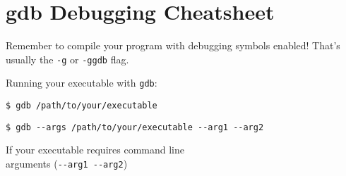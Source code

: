 \documentclass[10pt, a4paper, english, parskip, twocolumn]{scrartcl}
\newcommand{\code}[1]{\texttt{#1}}
\newcommand{\ddash}{-{}-}
\newcommand{\gdbsection}[1]{\begin{mdframed}[frametitlebackgroundcolor=bittersweet,style=section,
frametitle=#1]\end{mdframed}}
\begin{document}
	

\section*{gdb Debugging Cheatsheet}




\gdbsection{running gdb}

Remember to compile your program with debugging symbols enabled!
That's usually the \code{-g} or \code{-ggdb} flag.

Running your executable with \code{gdb}:
%
\begin{lstlisting}[belowskip=0pt]
$ gdb /path/to/your/executable
\end{lstlisting}
%
\begin{lstlisting}[belowskip=-0.8 \baselineskip]
$ gdb --args /path/to/your/executable --arg1 --arg2
\end{lstlisting}
%
\quad\quad If your executable requires command line \\
\quad\quad arguments (\code{\ddash arg1 \ddash arg2})
\end{document}
